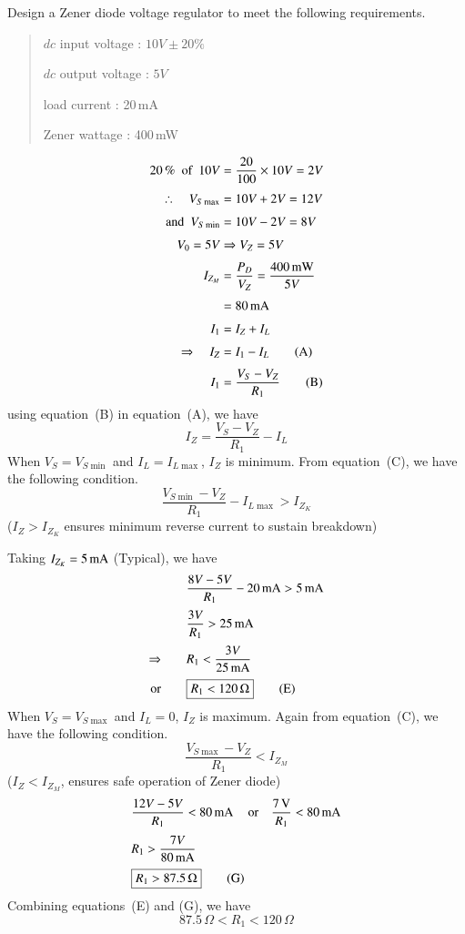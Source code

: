 \begin{example}\label{addexam2.34}
Design a Zener diode voltage regulator to meet the following requirements.
\begin{quote}
$dc$ input voltage : $10V\pm 20\%$

$dc$ output voltage : $5V$

load current : 20\,mA

Zener wattage : 400\,mW
\end{quote}
\end{example}

\begin{solution}
\begin{align*}
20\,\%~~\text{of}~~ 10V &= \frac{20}{100}\times 10V=2V\\[3pt]
\therefore\quad V_{S\max} &= 10V+2V=12V\\[3pt]
\text{and~ } V_{S\min} &= 10V-2V=8V\\[3pt]
V_{0}=5V &\Rightarrow V_{Z}=5V\\[3pt]
I_{Z_{M}} &=\frac{P_{D}}{V_{Z}}=\dfrac{400\text{\,mW}}{5V}\\[3pt]
&= 80\operatorname{mA}\\[3pt]
I_{1} &= I_{Z}+I_{L}\\[3pt]
\Rightarrow\quad I_{Z} &= I_{1}-I_{L}\tag{A}\\[3pt]
I_{1} &= \frac{V_{S}-V_{Z}}{R_{1}}\tag{B}
\end{align*}
using equation~(B) in equation~(A), we have
\begin{equation*}
I_{Z}=\dfrac{V_{S}-V_{Z}}{R_{1}}-I_{L}\tag{C}
\end{equation*}
When $V_{S}=V_{S\min}$ and $I_{L}=I_{L\max}$, $I_{Z}$ is minimum. From equation~(C), we have the following condition.
\begin{equation*}
\frac{V_{S\min}-V_{Z}}{R_{1}}-I_{L\max}>I_{Z_{K}}\tag{D}
\end{equation*}
($I_{Z}>I_{Z_{K}}$ ensures minimum reverse current to sustain breakdown)

Taking $I_{Z_{K}}=5\operatorname{mA}$ (Typical), we have
\begin{align*}
& \frac{8V-5V}{R_{1}}-20\operatorname{mA}>5\operatorname{mA}\\[2pt]
& \frac{3V}{R_{1}}>25\operatorname{mA}\\[2pt]
\Rightarrow\qquad & R_{1}<\frac{3V}{25\operatorname{mA}}\\[2pt]
\text{or}\qquad & \text{\fbox{$R_{1}<120\,\Omega$}}\tag{E}
\end{align*}
When $V_{S}=V_{S\max}$ and $I_{L}=0$, $I_{Z}$ is maximum. Again from equation~(C), we have the following condition.
\begin{equation}
\frac{V_{S\max}-V_{Z}}{R_{1}}<I_{Z_{M}}\tag{F}
\end{equation}
($I_{Z}<I_{Z_{M}}$, ensures safe operation of Zener diode)
\begin{align*}
& \frac{12V-5V}{R_{1}}<80\operatorname{mA}\quad\text{or}\quad \frac{7\operatorname{\mathrm{V}}}{R_{1}}<80\operatorname{mA}\\[3pt]
& R_{1}>\frac{7V}{80\operatorname{mA}}\\[2pt]
& \text{\fbox{$R_{1}>87.5\,\Omega$}}\tag{G}
\end{align*}
Combining equations~(E) and (G), we have
$$
87.5\,\Omega < R_{1}<120\,\Omega
$$


\end{solution}
